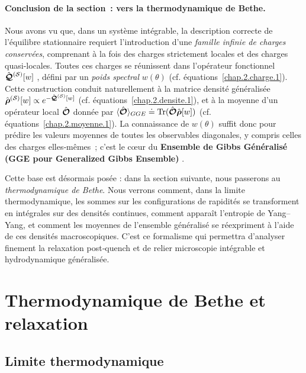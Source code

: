 \paragraph{Conclusion de la section : vers la thermodynamique de Bethe.}

Nous avons vu que, dans un système intégrable, la description correcte de l’équilibre stationnaire requiert l’introduction d’une \emph{famille infinie de charges conservées}, comprenant à la fois des charges strictement locales et des charges quasi‑locales.
Toutes ces charges se réunissent dans l’opérateur fonctionnel
\(
\hat{\bm{\mathcal{Q}}}^{(\mathcal{S})}[w]
\)
, défini par un \emph{poids spectral}  $w(\theta)$ (cf. équations~\eqref{chap.2.charge.1}).
Cette construction conduit naturellement à la matrice densité généralisée
\(
\hat{\bm{\rho}}^{(\mathcal{S})}[w]  \propto  e^{-\hat{\bm{\mathcal{Q}}}^{(\mathcal{S})}[w]}
\) 
(cf. équations~\eqref{chap.2.densite.1}), et à la moyenne d’un opérateur local $\hat{\bm{\mathcal{O}}}$ donnée par
\(
\langle \hat{\bm{\mathcal{O}}}\rangle_{GGE}  \doteq  \displaystyle  \text{Tr} (\hat{\bm{\mathcal{O}}}\hat{\bm{\rho}}[w])
\)
(cf. équations~\eqref{chap.2.moyenne.1}).
La connaissance de $w(\theta)$ suffit donc pour prédire les valeurs moyennes de toutes les observables diagonales, y compris celles des charges elles‑mêmes ; c’est le cœur du {\bf Ensemble de Gibbs Généralisé (GGE pour Generalized Gibbs Ensemble)} .

\medskip
Cette base est désormais posée : dans la section suivante, nous passerons au \emph{thermodynamique de Bethe}.
Nous verrons comment, dans la limite thermodynamique, les sommes sur les configurations de rapidités se transforment en intégrales sur des densités continues, comment apparaît l’entropie de Yang–Yang, et comment les moyennes de l’ensemble généralisé se réexpriment à l’aide de ces densités macroscopiques.
C’est ce formalisme qui permettra d’analyser finement la relaxation post‑quench et de relier microscopie intégrable et hydrodynamique généralisée.

%

\section{Thermodynamique de Bethe et relaxation}

\subsection{Limite thermodynamique}

